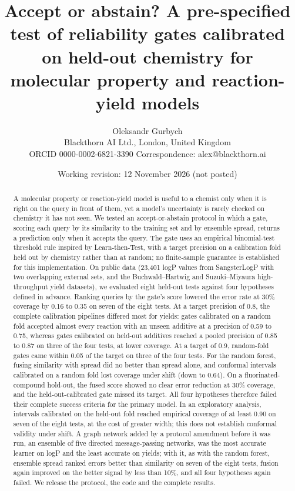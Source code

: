 \documentclass[11pt,letterpaper]{article}
\title{\bfseries Accept or abstain? A pre-specified test of reliability gates calibrated on held-out chemistry for molecular property and reaction-yield models}
\author{Oleksandr Gurbych\\[0.3em]
\small Blackthorn AI Ltd., London, United Kingdom\\
\small ORCID 0000-0002-6821-3390 \quad Correspondence: alex@blackthorn.ai}
\date{Working revision: 12 November 2026 (not posted)}
\begin{document}
\maketitle

\begin{abstract}
\noindent A molecular property or reaction-yield model is useful to a chemist only when it is right on the query in front of them, yet a model's uncertainty is rarely checked on chemistry it has not seen. We tested an accept-or-abstain protocol in which a gate, scoring each query by its similarity to the training set and by ensemble spread, returns a prediction only when it accepts the query. The gate uses an empirical binomial-test threshold rule inspired by Learn-then-Test, with a target precision on a calibration fold held out by chemistry rather than at random; no finite-sample guarantee is established for this implementation. On public data (23,401 logP values from SangsterLogP with two overlapping external sets, and the Buchwald--Hartwig and Suzuki--Miyaura high-throughput yield datasets), we evaluated eight held-out tests against four hypotheses defined in advance. Ranking queries by the gate's score lowered the error rate at 30\% coverage by 0.16 to 0.35 on seven of the eight tests. At a target precision of 0.8, the complete calibration pipelines differed most for yields: gates calibrated on a random fold accepted almost every reaction with an unseen additive at a precision of 0.59 to 0.75, whereas gates calibrated on held-out additives reached a pooled precision of 0.85 to 0.87 on three of the four tests, at lower coverage. At a target of 0.9, random-fold gates came within 0.05 of the target on three of the four tests. For the random forest, fusing similarity with spread did no better than spread alone, and conformal intervals calibrated on a random fold lost coverage under shift (down to 0.64). On a fluorinated-compound hold-out, the fused score showed no clear error reduction at 30\% coverage, and the held-out-calibrated gate missed its target. All four hypotheses therefore failed their complete success criteria for the primary model. In an exploratory analysis, intervals calibrated on the held-out fold reached empirical coverage of at least 0.90 on seven of the eight tests, at the cost of greater width; this does not establish conformal validity under shift. A graph network added by a protocol amendment before it was run, an ensemble of five directed message-passing networks, was the most accurate learner on logP and the least accurate on yields; with it, as with the random forest, ensemble spread ranked errors better than similarity on seven of the eight tests, fusion again improved on the better signal by less than 10\%, and all four hypotheses again failed. We release the protocol, the code and the complete results.
\end{abstract}
\end{document}
